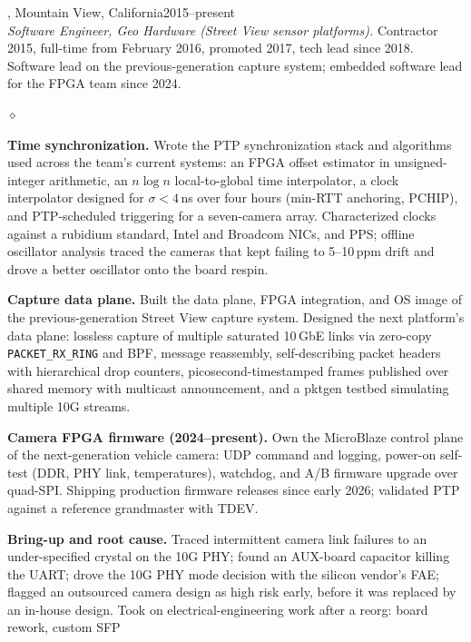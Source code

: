 \documentclass{webster-resume}
\newlength{\secgap}\setlength{\secgap}{0.32cm}
\newcommand{\seclabel}[1]{\llap{{\small\bfseries #1}\hskip\secgap}}
\newcommand{\secsp}{\par\addvspace{0.75em plus 0.2em}}
\newenvironment{list3}{
  \begin{list}{$\diamond$}{%
      \setlength{\itemsep}{-0.05in}
      \setlength{\parsep}{.05in} \setlength{\parskip}{0in}
      \setlength{\topsep}{0in} \setlength{\partopsep}{0in}
      \setlength{\leftmargin}{0.2in}}}{\end{list}}
\newenvironment{resitem}[1][]{%
  \par\addvspace{0.5em}\noindent\def\resdate{\hfill{\small #1}}%
  \begin{minipage}{\textwidth}\noindent}{\end{minipage}\par}
\begin{document}
\secsp
\begin{resitem}[2015--present]
\seclabel{Experience}{\bf Google LLC}, Mountain View, California\resdate\\
\textsl{Software Engineer, Geo Hardware (Street View sensor platforms).}
Contractor 2015, full-time from February 2016, promoted 2017, tech lead
since 2018.  Software lead on the previous-generation capture system;
embedded software lead for the FPGA team since 2024.
\begin{list3}
\item {\bf Time synchronization.}  Wrote the PTP synchronization stack and
  algorithms used across the team's current systems: an FPGA offset
  estimator in unsigned-integer arithmetic, an $n\log n$ local-to-global
  time interpolator, a clock interpolator designed for $\sigma<4$\,ns over
  four hours (min-RTT anchoring, PCHIP), and PTP-scheduled triggering for a
  seven-camera array.  Characterized clocks against a rubidium standard,
  Intel and Broadcom NICs, and PPS; offline oscillator analysis traced the
  cameras that kept failing to 5--10\,ppm drift and drove a better
  oscillator onto the board respin.
\item {\bf Capture data plane.}  Built the data plane, FPGA integration, and
  OS image of the previous-generation Street View capture system.  Designed
  the next platform's data plane: lossless capture of multiple saturated
  10\,GbE links via zero-copy \texttt{PACKET\_RX\_RING} and BPF, message
  reassembly, self-describing packet headers with hierarchical drop
  counters, picosecond-timestamped frames published over shared memory with
  multicast announcement, and a pktgen testbed simulating multiple 10G
  streams.
\item {\bf Camera FPGA firmware (2024--present).}  Own the MicroBlaze control
  plane of the next-generation vehicle camera: UDP command and logging,
  power-on self-test (DDR, PHY link, temperatures), watchdog, and A/B
  firmware upgrade over quad-SPI.  Shipping production firmware releases
  since early 2026; validated PTP against a reference grandmaster with TDEV.
\item {\bf Bring-up and root cause.}  Traced intermittent camera link
  failures to an under-specified crystal on the 10G PHY; found an AUX-board
  capacitor killing the UART; drove the 10G PHY mode decision with the
  silicon vendor's FAE; flagged an outsourced camera design as high risk
  early, before it was replaced by an in-house design.  Took on
  electrical-engineering work after a reorg: board rework, custom SFP

\end{list3}
\end{resitem}
\end{document}
